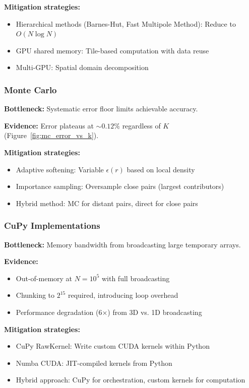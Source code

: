 \documentclass[11pt,a4paper]{article}
\begin{document}
\textbf{Mitigation strategies:}
\begin{itemize}
\item Hierarchical methods (Barnes-Hut, Fast Multipole Method): Reduce to $O(N \log N)$
\item GPU shared memory: Tile-based computation with data reuse
\item Multi-GPU: Spatial domain decomposition
\end{itemize}

\subsubsection{Monte Carlo}

\textbf{Bottleneck:} Systematic error floor limits achievable accuracy.

\textbf{Evidence:} Error plateaus at $\sim0.12\%$ regardless of $K$ (Figure~\ref{fig:mc_error_vs_k}).

\textbf{Mitigation strategies:}
\begin{itemize}
\item Adaptive softening: Variable $\epsilon(r)$ based on local density
\item Importance sampling: Oversample close pairs (largest contributors)
\item Hybrid method: MC for distant pairs, direct for close pairs
\end{itemize}

\subsubsection{CuPy Implementations}

\textbf{Bottleneck:} Memory bandwidth from broadcasting large temporary arrays.

\textbf{Evidence:}
\begin{itemize}
\item Out-of-memory at $N=10^5$ with full broadcasting
\item Chunking to $2^{15}$ required, introducing loop overhead
\item Performance degradation (6×) from 3D vs. 1D broadcasting
\end{itemize}

\textbf{Mitigation strategies:}
\begin{itemize}
\item CuPy RawKernel: Write custom CUDA kernels within Python
\item Numba CUDA: JIT-compiled kernels from Python
\item Hybrid approach: CuPy for orchestration, custom kernels for computation
\end{itemize}
\end{document}

